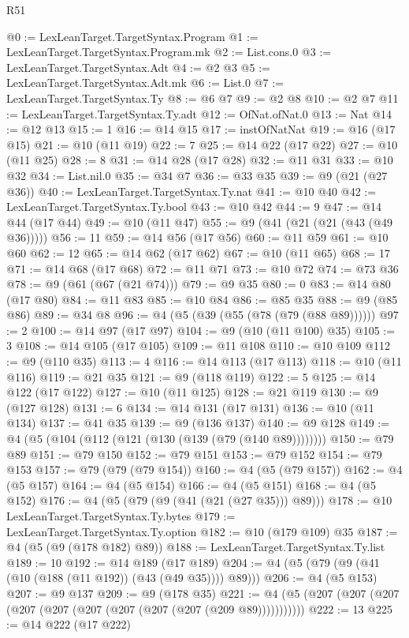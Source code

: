 \begin{lexlean}{R51}
\begin{coremodule}
@0 := LexLeanTarget.TargetSyntax.Program
@1 := LexLeanTarget.TargetSyntax.Program.mk
@2 := List.cons.{0}
@3 := LexLeanTarget.TargetSyntax.Adt
@4 := @2 @3
@5 := LexLeanTarget.TargetSyntax.Adt.mk
@6 := List.{0}
@7 := LexLeanTarget.TargetSyntax.Ty
@8 := @6 @7
@9 := @2 @8
@10 := @2 @7
@11 := LexLeanTarget.TargetSyntax.Ty.adt
@12 := OfNat.ofNat.{0}
@13 := Nat
@14 := @12 @13
@15 := 1
@16 := @14 @15
@17 := instOfNatNat
@19 := @16 (@17 @15)
@21 := @10 (@11 @19)
@22 := 7
@25 := @14 @22 (@17 @22)
@27 := @10 (@11 @25)
@28 := 8
@31 := @14 @28 (@17 @28)
@32 := @11 @31
@33 := @10 @32
@34 := List.nil.{0}
@35 := @34 @7
@36 := @33 @35
@39 := @9 (@21 (@27 @36))
@40 := LexLeanTarget.TargetSyntax.Ty.nat
@41 := @10 @40
@42 := LexLeanTarget.TargetSyntax.Ty.bool
@43 := @10 @42
@44 := 9
@47 := @14 @44 (@17 @44)
@49 := @10 (@11 @47)
@55 := @9 (@41 (@21 (@21 (@43 (@49 @36)))))
@56 := 11
@59 := @14 @56 (@17 @56)
@60 := @11 @59
@61 := @10 @60
@62 := 12
@65 := @14 @62 (@17 @62)
@67 := @10 (@11 @65)
@68 := 17
@71 := @14 @68 (@17 @68)
@72 := @11 @71
@73 := @10 @72
@74 := @73 @36
@78 := @9 (@61 (@67 (@21 @74)))
@79 := @9 @35
@80 := 0
@83 := @14 @80 (@17 @80)
@84 := @11 @83
@85 := @10 @84
@86 := @85 @35
@88 := @9 (@85 @86)
@89 := @34 @8
@96 := @4 (@5 (@39 (@55 (@78 (@79 (@88 @89))))))
@97 := 2
@100 := @14 @97 (@17 @97)
@104 := @9 (@10 (@11 @100) @35)
@105 := 3
@108 := @14 @105 (@17 @105)
@109 := @11 @108
@110 := @10 @109
@112 := @9 (@110 @35)
@113 := 4
@116 := @14 @113 (@17 @113)
@118 := @10 (@11 @116)
@119 := @21 @35
@121 := @9 (@118 @119)
@122 := 5
@125 := @14 @122 (@17 @122)
@127 := @10 (@11 @125)
@128 := @21 @119
@130 := @9 (@127 @128)
@131 := 6
@134 := @14 @131 (@17 @131)
@136 := @10 (@11 @134)
@137 := @41 @35
@139 := @9 (@136 @137)
@140 := @9 @128
@149 := @4 (@5 (@104 (@112 (@121 (@130 (@139 (@79 (@140 @89))))))))
@150 := @79 @89
@151 := @79 @150
@152 := @79 @151
@153 := @79 @152
@154 := @79 @153
@157 := @79 (@79 (@79 @154))
@160 := @4 (@5 (@79 @157))
@162 := @4 (@5 @157)
@164 := @4 (@5 @154)
@166 := @4 (@5 @151)
@168 := @4 (@5 @152)
@176 := @4 (@5 (@79 (@9 (@41 (@21 (@27 @35))) @89)))
@178 := @10 LexLeanTarget.TargetSyntax.Ty.bytes
@179 := LexLeanTarget.TargetSyntax.Ty.option
@182 := @10 (@179 @109) @35
@187 := @4 (@5 (@9 (@178 @182) @89))
@188 := LexLeanTarget.TargetSyntax.Ty.list
@189 := 10
@192 := @14 @189 (@17 @189)
@204 := @4 (@5 (@79 (@9 (@41 (@10 (@188 (@11 @192)) (@43 (@49 @35)))) @89)))
@206 := @4 (@5 @153)
@207 := @9 @137
@209 := @9 (@178 @35)
@221 := @4 (@5 (@207 (@207 (@207 (@207 (@207 (@207 (@207 (@207 (@207 (@209 @89)))))))))))
@222 := 13
@225 := @14 @222 (@17 @222)

\end{coremodule}
\end{lexlean}
